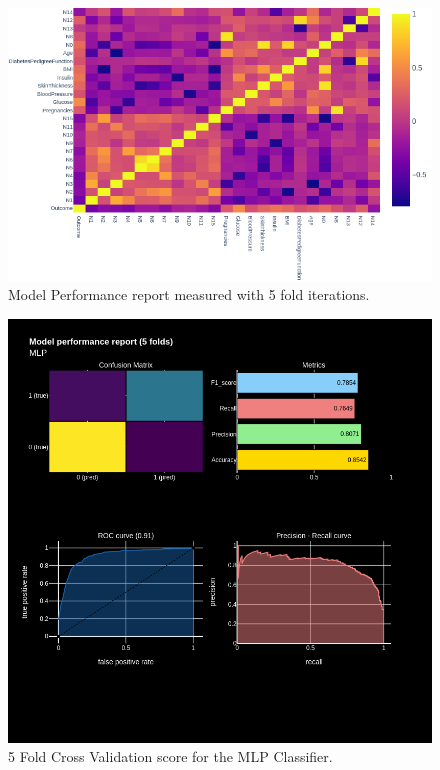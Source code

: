 \documentclass[12pt]{article}
\begin{document}
\begin{figure}[ht]
\centering
\includegraphics[width=1\textwidth]{newplot(42).png}
\caption{Model Performance report measured with 5 fold iterations.}
\end{figure}

\begin{figure}[ht]
\centering
\includegraphics[width=1\textwidth]{newplot(43).png}
\caption{5 Fold Cross Validation score for the MLP Classifier.}
\end{figure}
\end{document}
